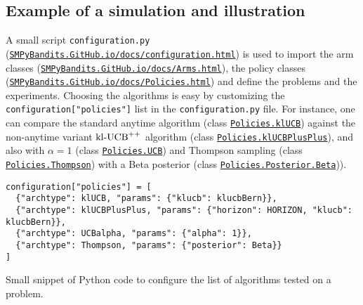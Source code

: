 \subsection{Example of a simulation and illustration}

A small script \texttt{configuration.py} (\texttt{\href{https://SMPyBandits.GitHub.io/docs/configuration.html}{SMPyBandits.GitHub.io/docs/configuration.html}}) is used to import the arm classes (\texttt{\href{https://SMPyBandits.GitHub.io/docs/Arms.html}{SMPyBandits.GitHub.io/docs/Arms.html}}), the policy classes (\texttt{\href{https://SMPyBandits.GitHub.io/docs/Policies.html}{SMPyBandits.GitHub.io/docs/Policies.html}}) and define the problems and the experiments.
Choosing the algorithms is easy by customizing the \texttt{configuration["policies"]} list in the \texttt{configuration.py} file.
For instance, one can compare the standard anytime \klUCB{} algorithm (class \texttt{\href{https://SMPyBandits.GitHub.io/docs/Policies.klUCB.html}{Policies.klUCB}}) against the non-anytime variant $\mathrm{kl}\text{-}\mathrm{UCB}^{++}$ algorithm (class \texttt{\href{https://SMPyBandits.GitHub.io/docs/Policies.klUCBPlusPlus.html}{Policies.klUCBPlusPlus}}), and also \UCB{} with $\alpha=1$ (class \texttt{\href{https://SMPyBandits.GitHub.io/docs/Policies.UCBalpha.html}{Policies.UCB}}) and Thompson sampling (class \texttt{\href{https://SMPyBandits.GitHub.io/docs/Policies.Thompson.html}{Policies.Thompson}}) with a Beta posterior (class \texttt{\href{https://SMPyBandits.GitHub.io/docs/Policies.Posterior.Beta.html}{Policies.Posterior.Beta}})).

\begin{listing}[h!]
    \begin{verbatim}
configuration["policies"] = [
  {"archtype": klUCB, "params": {"klucb": klucbBern}},
  {"archtype": klUCBPlusPlus, "params": {"horizon": HORIZON, "klucb": klucbBern}},
  {"archtype": UCBalpha, "params": {"alpha": 1}},
  {"archtype": Thompson, "params": {"posterior": Beta}}
]
    \end{verbatim}
    \caption{Small snippet of Python code to configure the list of algorithms tested on a problem.}
    \label{lst:3:howToConfigureAlgorithms}
\end{listing}

